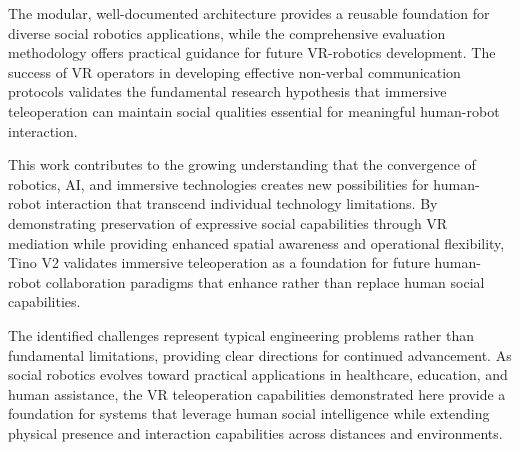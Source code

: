 The modular, well-documented architecture provides a reusable foundation for diverse social robotics applications, while the comprehensive evaluation methodology offers practical guidance for future VR-robotics development. The success of VR operators in developing effective non-verbal communication protocols validates the fundamental research hypothesis that immersive teleoperation can maintain social qualities essential for meaningful human-robot interaction.

This work contributes to the growing understanding that the convergence of robotics, AI, and immersive technologies creates new possibilities for human-robot interaction that transcend individual technology limitations. By demonstrating preservation of expressive social capabilities through VR mediation while providing enhanced spatial awareness and operational flexibility, Tino V2 validates immersive teleoperation as a foundation for future human-robot collaboration paradigms that enhance rather than replace human social capabilities.

The identified challenges represent typical engineering problems rather than fundamental limitations, providing clear directions for continued advancement. As social robotics evolves toward practical applications in healthcare, education, and human assistance, the VR teleoperation capabilities demonstrated here provide a foundation for systems that leverage human social intelligence while extending physical presence and interaction capabilities across distances and environments.
